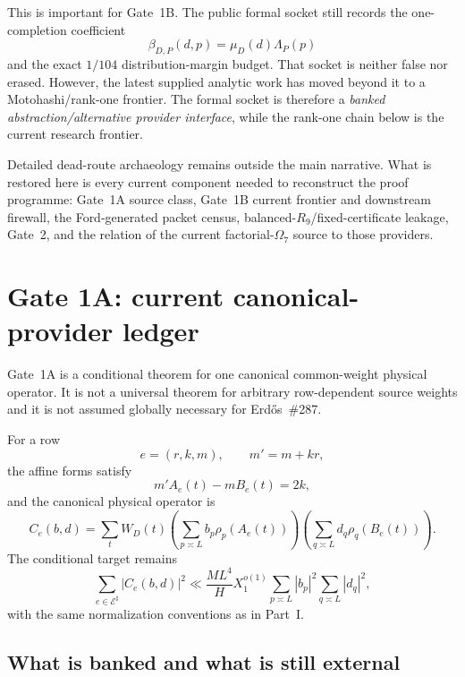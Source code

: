 \documentclass[11pt]{article}
\theoremstyle{definition}
\newcommand{\1}{\mathbf 1}
\begin{document}
{{{This is important for Gate~1B.  The public formal socket still records the one-completion
coefficient
\[
\beta_{D,P}(d,p)=\mu_D(d)\Lambda_P(p)
\]
and the exact $1/104$ distribution-margin budget.  That socket is neither false nor erased.
However, the latest supplied analytic work has moved beyond it to a Motohashi/rank-one
frontier.  The formal socket is therefore a \emph{banked abstraction/alternative provider
interface}, while the rank-one chain below is the current research frontier.

Detailed dead-route archaeology remains outside the main narrative.  What is restored here
is every current component needed to reconstruct the proof programme: Gate~1A source class,
Gate~1B current frontier and downstream firewall, the Ford-generated packet census,
balanced-$R_9$/fixed-certificate leakage, Gate~2, and the relation of the current
factorial-$\Omega_7$ source to those providers.

\section{Gate 1A: current canonical-provider ledger}
\label{sec:gate1a-ledger}

Gate~1A is a conditional theorem for one canonical common-weight physical operator.  It is
not a universal theorem for arbitrary row-dependent source weights and it is not assumed
globally necessary for Erd\H{o}s~\#287.

For a row
\[
e=(r,k,m),\qquad m'=m+kr,
\]
the affine forms satisfy
\[
m'A_e(t)-mB_e(t)=2k,
\]
and the canonical physical operator is
\[
C_e(b,d)=
\sum_tW_D(t)
\left(\sum_{p\asymp L}b_p\rho_p(A_e(t))\right)
\left(\sum_{q\asymp L}d_q\rho_q(B_e(t))\right).
\]
The conditional target remains
\[
\sum_{e\in\mathcal E^\sharp}|C_e(b,d)|^2
\ll
\frac{ML^4}{H}X_1^{o(1)}
\sum_{p\asymp L}|b_p|^2
\sum_{q\asymp L}|d_q|^2,
\]
with the same normalization conventions as in Part~I.

\subsection{What is banked and what is still external}

}}}
\end{document}
